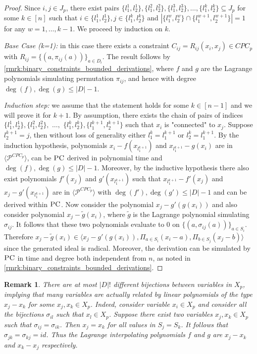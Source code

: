 \documentclass[11pt]{article}
\newcommand{\PC}{\textsc{PC}}
\newcommand{\1}{\textbf{1}}
\newtheorem{remark}[theorem]{Remark}
\begin{document}
\begin{proof}
    Since $i,j \in J_p$, there exist pairs $\{ l_1^1, l_2^1 \}, \{ l_1^2, l_2^2 \}, \{l_1^3, l_2^3\}, \ldots, \{l_1^k, l_2^k\} \subseteq J_p$ for some $k \in [n]$ such that $i \in \{ l_1^1, l_2^1 \}, j \in \{l_1^k, l_2^k\}$ and $|\{l_1^w, l_2^w\} \cap \{l_1^{w+1}, l_2^{w+1}\}| = 1$ for any $w = 1, \ldots, k-1$. We proceed by induction on $k$.

    \textit{Base Case (k=1):} in this case there exists a constraint $C_{ij} = R_{ij}(x_i,x_j) \in CPC_p$ with $R_{ij} = \{(a,\pi_{ij}(a))\}_{a \in D_i}$. The result follows by \cref{rmrk:binary_constraints_bounded_derivations}, where $f$ and $g$ are the Lagrange polynomials simulating permutation $\pi_{ij}$, and hence with degree $\deg(f), \deg(g) \leq |D| - 1$.

    \textit{Induction step:} we assume that the statement holds for some $k \in [n-1]$ and we will prove it for $k+1$. By assumption, there exists the chain of pairs of indices $\{ l_1^1, l_2^1 \}, \{ l_1^2, l_2^2 \},$ $ \ldots,$  $ \{l_1^k, l_2^k\}, \{l_1^{k+1}, l_2^{k+1}\}$ such that $x_i$ is "connected" to $x_j$. Suppose $l_2^{k+1} = j$, then without loss of generality either $l_1^k = l_1^{k+1}$ or $l_2^k = l_1^{k+1}$. By the induction hypothesis, polynomials $x_i - f(x_{l_1^{k+1}})$ and $x_{l_1^{k+1}} - g(x_i)$ are in $\langle \mathcal{P}^{CPC_p} \rangle$, can be $\PC$ derived in polynomial time and $\deg(f), \deg(g) \leq |D| - 1$. Moreover, by the inductive hypothesis there also exist polynomials $f'(x_j)$ and $g'(x_{l_1^{k+1}})$ such that $x_{l_1^{k+1}} - f'(x_j)$ and $x_j - g'(x_{l_1^{k+1}})$ are in $\langle \mathcal{P}^{CPC_p} \rangle$ with $\deg(f'),\deg(g') \leq |D| - 1$ and can be derived within $\PC$. Now consider the polynomial $x_j - g'(g(x_i))$ and also consider polynomial $x_j - \tilde{g}(x_i)$, where $\tilde{g}$ is the Lagrange polynomial simulating $\sigma_{ij}$. It follows that these two polynomials evaluate to 0 on $\{(a,\sigma_{ij}(a))\}_{a \in S_i}$. Therefore $x_j - \tilde{g}(x_i) \in \langle x_j - g'(g(x_i)), \Pi_{a \in S_i}(x_i - a), \Pi_{b \in S_j} (x_j - b) \rangle $ since the generated ideal is radical. Moreover, the derivation can be simulated by $\PC$ in time and degree both independent from $n$, as noted in \cref{rmrk:binary_constraints_bounded_derivations}.
\end{proof}


\begin{remark}
    There are at most $|D|!$ different bijections between variables in $X_p$, implying that many variables are actually related by linear polynomials of the type $x_j - x_k$ for some $x_j, x_k \in X_p$. Indeed, consider variable $x_i \in X_p$ and consider all the bijections $\sigma_{il}$ such that $x_l \in X_p$. Suppose there exist two variables $x_j, x_k \in X_p$ such that $\sigma_{ij} = \sigma_{ik}$. Then $x_j = x_k$ for all values in $S_j = S_k$. It follows that $\sigma_{jk} = \sigma_{kj} = id$. Thus the Lagrange interpolating polynomials $f$ and $g$ are $x_j - x_k$ and $x_k - x_j$ respectively.
\end{remark}
\end{document}
